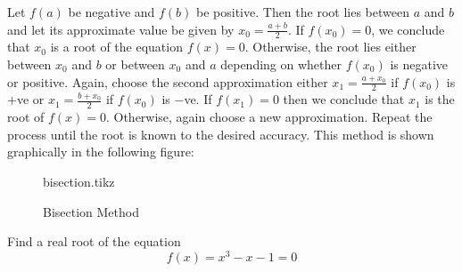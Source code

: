 \documentclass[12pt,class=book,crop=false]{standalone}
\begin{document}
Let \( f(a) \) be negative and \( f(b) \) be positive. Then the root lies between \( a \) and \( b \) and let its approximate value be given by \( x_0=\frac{a+b}{2} \). If \( f(x_0)=0 \), we conclude that \( x_0 \) is a root of the equation \( f(x)=0 \). Otherwise, the root lies either between \( x_0 \) and \( b \) or between \( x_0 \) and \( a \) depending on whether \( f(x_0) \) is negative or positive. Again, choose the second approximation either \( x_1=\frac{a+x_0}{2} \) if \( f(x_0) \) is \( + \)ve or \( x_1=\frac{b+x_0}{2}  \) if \( f(x_0) \) is \( - \)ve. If \( f(x_1)=0 \) then we conclude that \( x_1 \) is the root of \( f(x)=0 \). Otherwise, again choose a new approximation. Repeat the process until the root is known to the desired accuracy. This method is shown graphically in the following figure:
\begin{figure}[H]
    \centering
    {bisection.tikz}
    \caption{Bisection Method}
\end{figure}
\begin{prob}
    Find a real root of the equation
    \[
        f(x)=x^3-x-1=0
    \]
\end{prob}
\end{document}
